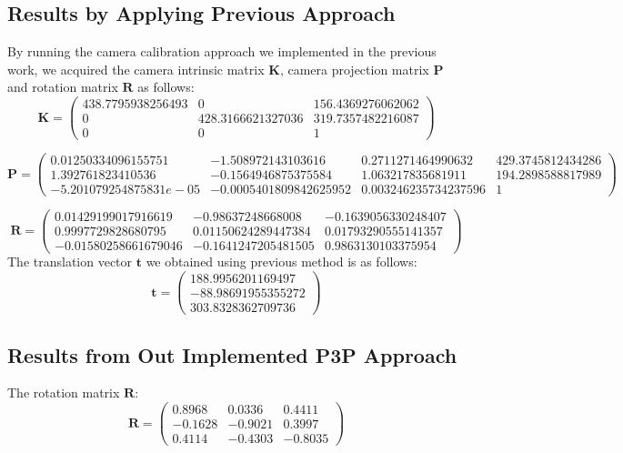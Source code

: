 \documentclass[conference]{IEEEtran}
\newcommand{\mat}[1]{\mathbf{#1}} %
\begin{document}
\subsection{Results by Applying Previous Approach}
By running the camera calibration approach we implemented in the previous work, we acquired the camera intrinsic matrix $\mat{K}$, camera projection matrix $\mat{P}$ and rotation matrix $\mat{R}$ as follows:
\begin{equation}
	\mat{K} = \begin{pmatrix}
		438.7795938256493 & 0 & 156.4369276062062\\
 0 & 428.3166621327036 & 319.7357482216087\\
 0 & 0 & 1
	\end{pmatrix}
\end{equation}

\begin{equation}
	\mat{P} = \begin{pmatrix}
		0.01250334096155751 & -1.508972143103616 & 0.2711271464990632 & 429.3745812434286\\
 1.392761823410536 & -0.1564946875375584 & 1.063217835681911 & 194.2898588817989\\
 -5.201079254875831e-05 & -0.0005401809842625952 & 0.003246235734237596 & 1
	\end{pmatrix}
\end{equation}

\begin{equation}
	\mat{R} = \begin{pmatrix}
		0.01429199017916619 & -0.98637248668008 & -0.1639056330248407\\
 0.9997729828680795 & 0.01150624289447384 & 0.01793290555141357\\
 -0.01580258661679046 & -0.1641247205481505 & 0.9863130103375954
	\end{pmatrix}
\end{equation}
The translation vector $\mat{t}$ we obtained using previous method is as follows:
\begin{equation}
	\mat{t} = \begin{pmatrix}
		188.9956201169497 \\
 -88.98691955355272 \\
 303.8328362709736
	\end{pmatrix}
\end{equation}

\subsection{Results from Out Implemented P3P Approach}
The rotation matrix $\mat{R}$:
\begin{equation}
	\mat{R} = \left(\begin{array}{ccc} 0.8968 & 0.0336 & 0.4411\\ -0.1628 & -0.9021 & 0.3997\\ 0.4114 & -0.4303 & -0.8035 \end{array}\right)
\end{equation}
\end{document}
